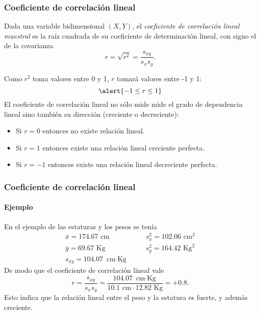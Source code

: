 \begin{frame}
\frametitle{Coeficiente de correlación lineal}
\begin{definicion}
Dada una variable bidimensional $(X,Y)$, el \emph{coeficiente de correlación lineal muestral} es
la raíz cuadrada de su coeficiente de determinación lineal, con signo el de la covarianza
\[
r = \sqrt{r^2} = \dfrac{s_{xy}}{s_xs_y}. 
\]
\end{definicion}
Como $r^2$ toma valores entre 0 y 1, $r$ tomará valores entre -1 y 1:
\[
\alert{-1\leq r\leq 1}
\]
El coeficiente de correlación lineal no sólo mide mide el grado de dependencia lineal sino también su dirección (creciente o decreciente):
\begin{itemize}
\item Si $r =0$ entonces no existe relación lineal.
\item Si $r=1$ entonces existe una relación lineal creciente perfecta.
\item Si $r=-1$ entonces existe una relación lineal decreciente perfecta.
\end{itemize}

\end{frame}


\begin{frame}
\frametitle{Coeficiente de correlación lineal}
\framesubtitle{Ejemplo}
En el ejemplo de las estaturas y los pesos se tenía 
\[
\begin{array}{lll}
\bar x = 174.67 \mbox{ cm} & \quad & s^2_x = 102.06 \mbox{ cm}^2\\
\bar y = 69.67 \mbox{ Kg} & & s^2_y = 164.42 \mbox{ Kg}^2\\
s_{xy} = 104.07 \mbox{ cm$\cdot$Kg}
\end{array}
\]
De modo que el coeficiente de correlación lineal vale
\[
r = \frac{s_{xy}}{s_xs_y} = \frac{104.07 \mbox{ cm$\cdot$Kg}}{10.1 \mbox{ cm} \cdot 12.82 \mbox{ Kg}} = +0.8.
\]
Esto indica que la relación lineal entre el peso y la estatura es fuerte, y además creciente.

\end{frame}



